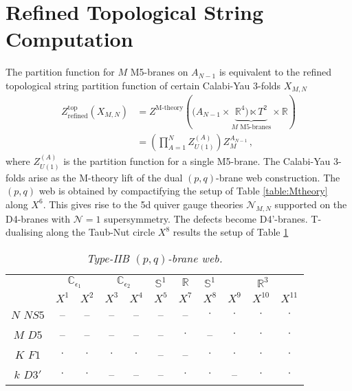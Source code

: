 \documentclass[main.tex]{subfiles}
\begin{document}
\section{Refined Topological String Computation}\label{sec:topovertexrev1}
The partition function for $M$ M5-branes on $A_{N-1}$ is equivalent to the refined topological string partition function of certain Calabi-Yau 3-folds $X_{M,N}$ 
\begin{align}\label{eqn:ztop}
Z^{\text{top}}_{\text{refined}}\left(X_{M,N}\right)&=Z^{\text{M-theory}}\left((A_{N-1}\times\underbrace{\mathbb{R}^4)\ltimes T^2}_{\text{$M$ M5-branes}}\times\mathbb{R}\right)\\&=\left(\prod_{A=1}^NZ_{U(1)}^{(A)}\right)Z^{A_{N-1}}_{M}\,,
\end{align} 
where $Z_{U(1)}^{(A)}$ is the partition function for a single M5-brane.
The Calabi-Yau 3-folds arise as the M-theory lift of the dual $(p,q)$-brane web construction. The $(p,q)$ web is obtained by compactifying the setup of Table \ref{table:Mtheory} along $X^6$. This gives rise to the 5d quiver gauge theories $\mathcal{N}_{M,N}$ supported on the D4-branes with $\mathcal{N}=1$ supersymmetry. The defects become D4'-branes. T-dualising along the Taub-Nut circle $X^8$ results the setup of Table \ref{table:IIBpq}
\begin{table}[ht!]
\centering
\begin{tabular}{ c |c| c| c| c| c| c| c| c| c| c| }
&\multicolumn{2}{c|}{$\mathbb{C}_{\epsilon_1}$}&\multicolumn{2}{c|}{$\mathbb{C}_{\epsilon_2}$}&\multicolumn{1}{c|}{$\mathbb{S}^1$}&\multicolumn{1}{c|}{$\mathbb{R}$}&\multicolumn{1}{c|}{$\mathbb{S}^1$}&\multicolumn{3}{c|}{$\mathbb{R}^3$}\\
   & $X^1$ & $X^2$ & $X^3$ & $X^4$ & $X^5$ & $X^7$ & $X^8$ & $X^9$ & $X^{10}$& $X^{11}$\\\hline 
    $N$ $NS5$ & --& -- & -- &-- & -- & -- & $\cdot$&$\cdot$ & $\cdot$ & $\cdot$\\ \hline
  $M$ $D5$ &-- & -- & -- & -- & -- & $\cdot$ & -- & $\cdot$ & $\cdot$ & $\cdot$\\ \hline
  $K$ $F1$ & $\cdot$ & $\cdot$ & $\cdot$ & $\cdot$  & -- & --& $\cdot$&$\cdot$  & $\cdot$ & $\cdot$ \\\hline
 $k$ $D3'$ & $\cdot$& $\cdot$ & -- & -- & -- &  $\cdot$&$\cdot$ &-- & $\cdot$ & $\cdot$\\ \hline
\end{tabular}
\caption{\it Type-IIB $(p,q)$-brane web.}
\label{table:IIBpq}
\end{table}
\end{document}
